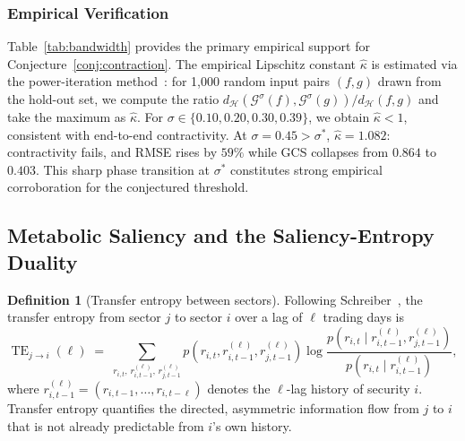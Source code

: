 \documentclass[11pt,a4paper]{article}  %
\DeclareMathOperator{\TE}{TE}
\newcommand{\Hilbert}{\mathcal{H}}
\newcommand{\Gop}{\mathcal{G}^{\sigma}}
\theoremstyle{plain}
\theoremstyle{definition}
\newtheorem{definition}{Definition}[section]
\theoremstyle{remark}
\begin{document}
\subsubsection{Empirical Verification}
\label{subsubsec:empirical_thm}

Table~\ref{tab:bandwidth} provides the primary empirical support for
Conjecture~\ref{conj:contraction}. The empirical Lipschitz constant
$\hat{\kappa}$ is estimated via the power-iteration
method~\cite{Yoshida2017}: for 1{,}000 random input pairs
$(f,g)$ drawn from the hold-out set, we compute the ratio
$d_{\Hilbert}(\Gop(f),\Gop(g))/d_{\Hilbert}(f,g)$ and take the
maximum as $\hat{\kappa}$. For $\sigma \in \{0.10,0.20,0.30,0.39\}$,
we obtain $\hat{\kappa} < 1$, consistent with end-to-end
contractivity. At $\sigma = 0.45 > \sigma^*$, $\hat{\kappa} = 1.082$:
contractivity fails, and RMSE rises by $59\%$ while GCS collapses
from $0.864$ to $0.403$. This sharp phase transition at $\sigma^*$
constitutes strong empirical corroboration for the conjectured
threshold.


\subsection{Metabolic Saliency and the Saliency-Entropy Duality}
\label{subsec:saliency}

\begin{definition}[Transfer entropy between sectors]
\label{def:te}
Following Schreiber~\cite{Schreiber2000}, the transfer entropy
from sector $j$ to sector $i$ over a lag of $\ell$ trading days is
\[
   \TE_{j\to i}(\ell)
   \;=\; \sum_{r_{i,t},\,r_{i,t-1}^{(\ell)},\,r_{j,t-1}^{(\ell)}}
   p\!\left(r_{i,t},r_{i,t-1}^{(\ell)},r_{j,t-1}^{(\ell)}\right)
   \log\frac{p\!\left(r_{i,t}\mid r_{i,t-1}^{(\ell)},r_{j,t-1}^{(\ell)}\right)}
            {p\!\left(r_{i,t}\mid r_{i,t-1}^{(\ell)}\right)},
\]
where $r_{i,t-1}^{(\ell)} = (r_{i,t-1},\ldots,r_{i,t-\ell})$ denotes
the $\ell$-lag history of security $i$. Transfer entropy quantifies
the directed, asymmetric information flow from $j$ to $i$ that is not
already predictable from $i$'s own history.
\end{definition}
\end{document}
